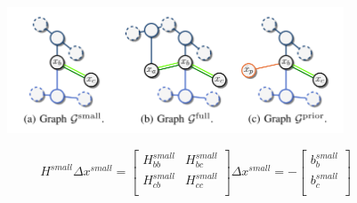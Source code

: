 \documentclass[letterpaper,10pt]{article}
\begin{document}
\begin{figure}[!ht]
	\centering
	\includegraphics[width=10cm]{./img/schur.png}
\end{figure}

\begin{equation}
H^{small} \Delta x^{small} =\left[\begin{array}{cc}
H_{bb}^{small} & H_{bc}^{small} \\
H_{cb}^{small} & H_{cc}^{small} \\
\end{array}\right] \Delta x^{small} = - \left[\begin{array}{c}
b_{b}^{small} \\
b_{c}^{small} \\
\end{array}\right]
\end{equation}
\end{document}
